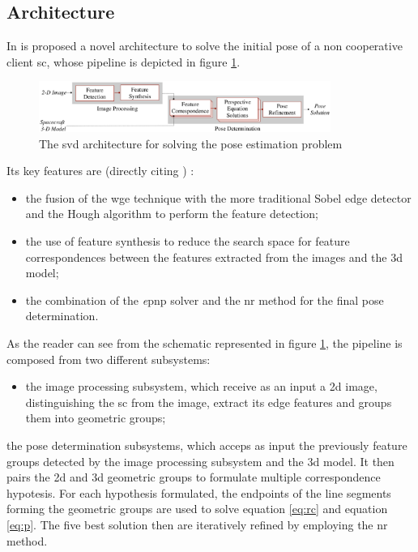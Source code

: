 \subsection{Architecture}
In \cite{Sharma2018} is proposed a novel architecture to solve the initial pose of a non cooperative client \acrshort{sc}, whose pipeline is depicted in figure \ref{fig:theposeproblem}.

\begin{figure}[htbp]
  \centering
  \includegraphics[width=0.85\textwidth]{gfx/SVDPipeline.eps}
  \caption{The \acrshort{svd} architecture for solving the pose estimation problem \cite{Sharma2018}}
  \label{fig:theposeproblem}
\end{figure}

Its key features are (directly citing \cite{Sharma2018})  :
\begin{itemize}
  \item the fusion of the \acrshort{wge} technique with the more traditional Sobel edge detector and the Hough algorithm to perform the feature detection;
  \item the use of feature synthesis to reduce the search space for feature correspondences between the features extracted from the images and the \acrshort{3d} model;
  \item the combination of the \textit{e}\acrshort{pnp} solver and the \acrfull{nr} method for the final pose determination.
\end{itemize}

As the reader can see from the schematic represented in figure \ref{fig:theposeproblem}, the pipeline is composed from two different subsystems:
\begin{itemize}
  \item the image processing subsystem, which receive as an input a \acrshort{2d} image, distinguishing the \acrshort{sc} from the image, extract its edge features and groups them into geometric groups;
\end{itemize} the pose determination subsystems, which acceps as input the previously feature groups detected by the image processing subsystem and the \acrshort{3d} model. It then pairs the \acrshort{2d} and \acrshort{3d} geometric groups to formulate multiple correspondence hypotesis. For each hypothesis formulated, the endpoints of the line segments forming the geometric groups are used to solve equation \eqref{eq:rc} and equation \eqref{eq:p}. The five best solution then are iteratively refined by employing the \acrshort{nr} method.

